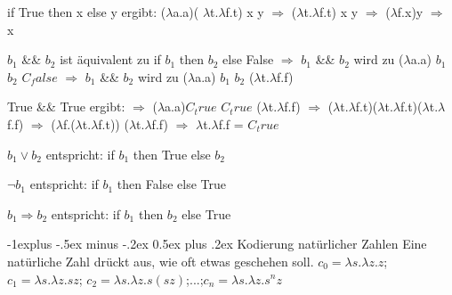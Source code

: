 \documentclass[10pt]{article}
\makeatletter
\renewcommand{\subsection}{\@startsection{subsection}{2}{0mm}%
                                {-1explus -.5ex minus -.2ex}%
                                {0.5ex plus .2ex}%
                                {\normalfont\normalsize\bfseries}}
\makeatother
\begin{document}
  \begin{itemize*}
    \item if True then x else y ergibt:
    \subitem ($\lambda$\color{blue}a.a\color{black})(\color{red} $\lambda$t.$\lambda$f.t\color{black}) x y $\Rightarrow$ ($\lambda$\color{blue}t\color{black}.$\lambda$f.\color{blue}t\color{black}) \color{red}x\color{black} y $\Rightarrow$ ($\lambda$\color{blue}f\color{black}.x)\color{red}y\color{black} $\Rightarrow$ x
    \item $b_1$ \&\& $b_2$ ist äquivalent zu if $b_1$ then $b_2$ else False
    \subitem $\Rightarrow$  $b_1$ \&\& $b_2$ wird zu ($\lambda$a.a) $b_1$ $b_2$ $C_false$
    \subitem $\Rightarrow$  $b_1$ \&\& $b_2$ wird zu ($\lambda$a.a) $b_1$ $b_2$ ($\lambda$t.$\lambda$f.f)
    \item True \&\& True ergibt:
    \subitem \color{white} $\Rightarrow$ \color{black}($\lambda$\color{blue}a.a\color{black})\color{red}$C_true$ \color{black} $C_true$ ($\lambda$t.$\lambda$f.f)
    \subitem  $\Rightarrow$ ($\lambda$\color{blue}t\color{black}.$\lambda$f.\color{blue}t\color{black})\color{red}($\lambda$t.$\lambda$f.t)\color{black}($\lambda$t.$\lambda$f.f)
    \subitem $\Rightarrow$ ($\lambda$\color{blue}f\color{black}.($\lambda$t.$\lambda$f.t)) \color{red}($\lambda$t.$\lambda$f.f)\color{black} $\Rightarrow$ $\lambda$t.$\lambda$f.f = $C_true$
    \item $b_1 \lor b_2$ entspricht:
    \subitem if $b_1$ then True else $b_2$
    \item $\neg b_1$ entspricht:
    \subitem if $b_1$ then False else True
    \item $b_1 \Rightarrow b_2$ entspricht:
    \subitem if $b_1$ then $b_2$ else True
  \end{itemize*}
  
  \subsection{Kodierung natürlicher Zahlen}
  Eine natürliche Zahl drückt aus, wie oft etwas geschehen soll.
$c_0 = \lambda s.\lambda z.z$; $c_1=\lambda s.\lambda z.sz$; $c_2=\lambda s.\lambda z.s(sz)$;...;$c_n=\lambda s.\lambda z.s^n z$
\end{document}
